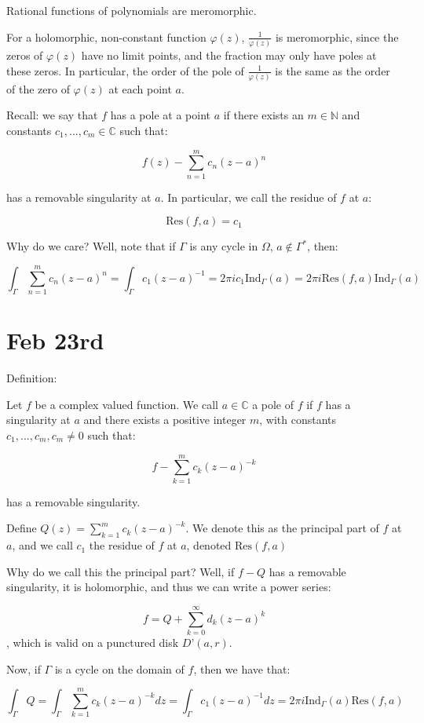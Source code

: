 \documentclass[10pt]{article}
\newcommand{\ind}{\text{Ind}}
\newcommand{\res}{\text{Res}}
\begin{document}
Rational functions of polynomials are meromorphic.

For a holomorphic, non-constant function $\varphi(z)$, $\frac{1}{\varphi(z)}$ is meromorphic, since the zeros of $\varphi(z)$ have no limit points, and the fraction may only have poles at these zeros. In particular, the order of the pole of $\frac{1}{\varphi(z)}$ is the same as the order of the zero of $\varphi(z)$ at each point $a$.

Recall: we say that $f$ has a pole at a point $a$ if there exists an $m \in \mathbb{N}$ and constants $c_1,...,c_m \in \mathbb{C}$ such that:

$$ f(z) - \sum_{n=1}^m c_n (z - a)^n $$ 

has a removable singularity at $a$. In particular, we call the residue of $f$ at $a$:

$$ \text{Res}(f,a) = c_1$$

Why do we care? Well, note that if $\Gamma$ is any cycle in $\Omega$, $a \not \in \Gamma^*$, then:

$$\int_\Gamma \sum_{n=1}^m c_n (z - a)^n  = \int_\Gamma c_1 (z-a)^{-1} = 2 \pi i c_1 \ind_\Gamma(a)  = 2\pi i \text{Res}(f,a) \ind_\Gamma(a)$$

\section*{Feb 23rd}

Definition:

Let $f$ be a complex valued function. We call $a \in \mathbb{C}$ a pole of $f$ if $f$ has a singularity at $a$ and there exists a positive integer $m$, with constants $c_1,...,c_m, c_m \not = 0$ such that:

$$ f - \sum_{k=1}^m c_k (z-a)^{-k} $$

has a removable singularity.

Define $Q(z) = \sum_{k=1}^m c_k (z-a)^{-k}$. We denote this as the principal part of $f$ at $a$, and we call $c_1$ the residue of $f$ at $a$, denoted $\res(f,a)$

Why do we call this the principal part? Well, if $f - Q$ has a removable singularity, it is holomorphic, and thus we can write a power series:

$$f = Q + \sum_{k=0}^\infty d_k (z-a)^k$$, which is valid on a punctured disk $D’(a,r)$.

Now, if $\Gamma$ is a cycle on the domain of $f$, then we have that:

$$ \int_\Gamma Q = \int_\Gamma  \sum_{k=1}^m c_k (z-a)^{-k} dz = \int_\Gamma c_1 (z -a)^{-1} dz  = 2 \pi i \ind_\Gamma(a) \res(f,a)$$
\end{document}
